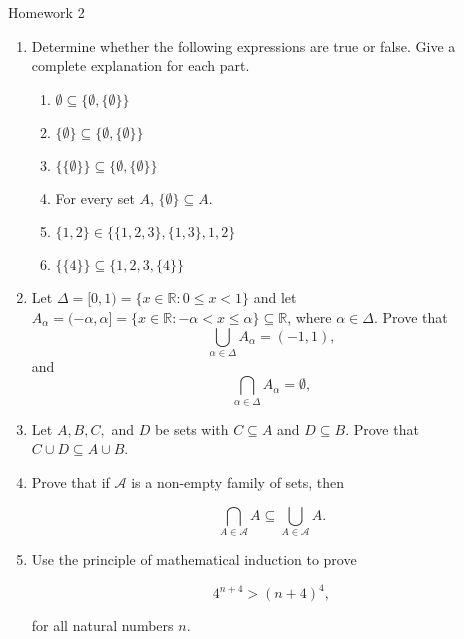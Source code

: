 \documentclass[10pt]{article} %
\theoremstyle{definition} %
\theoremstyle{plain}
\newcommand{\R}{\mathbb{R}}
\begin{document}

\begin{center}
Homework 2
\end{center}

\begin{enumerate}
\item Determine whether the following expressions are true or false.  Give a complete explanation for each part.

\begin{enumerate}
\item $\emptyset \subseteq \{\emptyset, \{ \emptyset \} \}$
\item $\{\emptyset\} \subseteq \{\emptyset, \{ \emptyset \} \}$
\item $\{\{\emptyset\}\} \subseteq \{\emptyset, \{ \emptyset \} \}$
\item For every set $A$, $\{\emptyset\} \subseteq A.$
\item $\{1,2\} \in \{\{1,2,3\},\{1,3\}, 1, 2\}$
\item $\{\{4\}\} \subseteq \{1,2,3,\{4\}\}$
\end{enumerate}

\item Let $\Delta = [0,1) = \{x \in \R: 0 \leq x < 1\}$ and let $A_\alpha = 
(-\alpha,\alpha] = \{x \in \R: -\alpha < x \leq \alpha\} \subseteq \R$, where $\alpha \in \Delta$.  Prove that 
$$\bigcup_{\alpha \in \Delta} A_\alpha = (-1,1),$$
and
$$\bigcap_{\alpha \in \Delta} A_\alpha = \emptyset,$$

\item Let $A, B, C,$ and $D$ be sets with $C \subseteq A$ and $D \subseteq B$.  Prove that $C \cup D \subseteq A \cup B$.

\item Prove that if $\mathcal{A}$ is a non-empty family of sets, then

$$\bigcap_{A \in \mathcal{A}}A \subseteq \bigcup_{A \in \mathcal{A}} A.$$

\item Use the principle of mathematical induction to prove 

$$4^{n+4} > (n+4)^4,$$

for all natural numbers $n$.

\end{enumerate}
\end{document}
